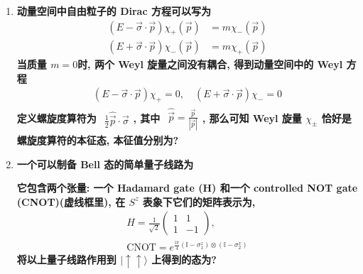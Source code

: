 \documentclass[../../main.tex]{subfiles}
\begin{document}
\begin{enumerate}
  \item \textbf{动量空间中自由粒子的 Dirac 方程可以写为
  \begin{align*}
    \left(E - \vec{\sigma}\cdot\vec{p}\right)\chi_{+}(\vec{p}) &= m\chi_{-}(\vec{p})\\
    \left(E + \vec{\sigma}\cdot\vec{p}\right)\chi_{-}(\vec{p}) &= m\chi_{+}(\vec{p})
  \end{align*}
  当质量 $m=0$时, 两个 Weyl 旋量之间没有耦合, 得到动量空间中的 Weyl 方程
  \begin{align*}
    \left(E - \vec{\sigma}\cdot\vec{p}\right)\chi_{+} = 0, \quad \left(E + \vec{\sigma}\cdot\vec{p}\right)\chi_{-} = 0
  \end{align*}
  定义螺旋度算符为 $\begin{aligned}
    \frac{1}{2}\hat{\vec{p}}\cdot\vec{\sigma}
  \end{aligned}$, 其中 $\begin{aligned}
    \hat{\vec{p}} = \frac{\vec{p}}{|\vec{p}|}
  \end{aligned}$, 那么可知 Weyl 旋量 $\chi_{\pm}$ 恰好是螺旋度算符的本征态, 本征值分别为?}

  \item \textbf{一个可以制备 Bell 态的简单量子线路为}


  \textbf{它包含两个张量: 一个 Hadamard gate (H) 和一个 controlled NOT gate (CNOT)(虚线框里), 在 $S^{z}$ 表象下它们的矩阵表示为,
  \begin{align*}
    H = \frac{1}{\sqrt{2}}\begin{pmatrix}
      1 & 1\\
      1 & -1
    \end{pmatrix},\\
    \text{CNOT} = e^{\frac{\mathrm{i}\pi}{4}(\mathbb{I} - \sigma_{1}^{z})\otimes (\mathbb{I} - \sigma_{2}^{x})}
  \end{align*}
  将以上量子线路作用到 $|\uparrow\uparrow\rangle$ 上得到的态为?}
\end{enumerate}
\end{document}
